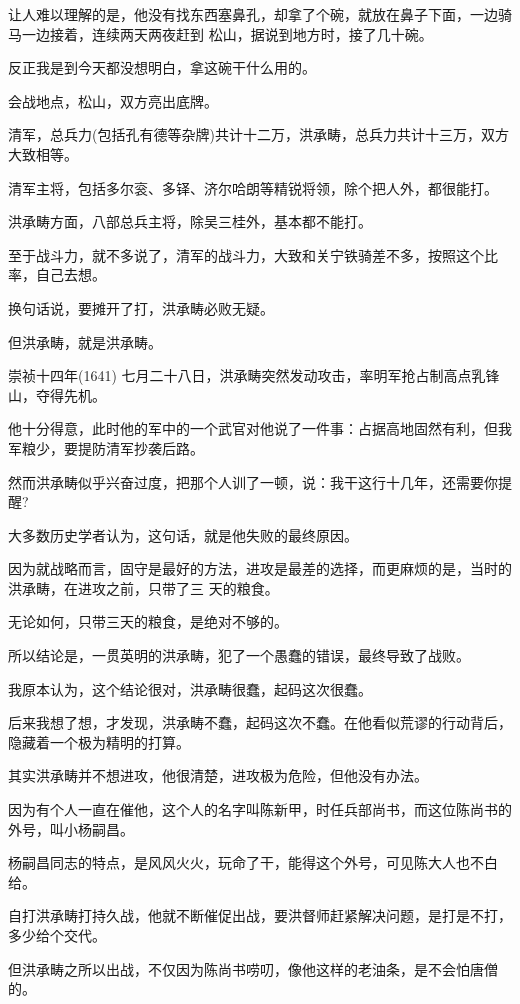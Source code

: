 \documentclass[11pt,a4paper,onecolumn]{article}
\begin{document}
让人难以理解的是，他没有找东西塞鼻孔，却拿了个碗，就放在鼻子下面，一边骑马一边接着，连续两天两夜赶到
松山，据说到地方时，接了几十碗。

反正我是到今天都没想明白，拿这碗干什么用的。

会战地点，松山，双方亮出底牌。

清军，总兵力(包括孔有德等杂牌)共计十二万，洪承畴，总兵力共计十三万，双方大致相等。

清军主将，包括多尔衮、多铎、济尔哈朗等精锐将领，除个把人外，都很能打。

洪承畴方面，八部总兵主将，除吴三桂外，基本都不能打。

至于战斗力，就不多说了，清军的战斗力，大致和关宁铁骑差不多，按照这个比率，自己去想。

换句话说，要摊开了打，洪承畴必败无疑。

但洪承畴，就是洪承畴。

崇祯十四年(1641) 七月二十八日，洪承畴突然发动攻击，率明军抢占制高点乳锋山，夺得先机。

他十分得意，此时他的军中的一个武官对他说了一件事：占据高地固然有利，但我军粮少，要提防清军抄袭后路。

然而洪承畴似乎兴奋过度，把那个人训了一顿，说：我干这行十几年，还需要你提醒?

大多数历史学者认为，这句话，就是他失败的最终原因。

因为就战略而言，固守是最好的方法，进攻是最差的选择，而更麻烦的是，当时的洪承畴，在进攻之前，只带了三
天的粮食。

无论如何，只带三天的粮食，是绝对不够的。

所以结论是，一贯英明的洪承畴，犯了一个愚蠢的错误，最终导致了战败。

我原本认为，这个结论很对，洪承畴很蠢，起码这次很蠢。

后来我想了想，才发现，洪承畴不蠢，起码这次不蠢。在他看似荒谬的行动背后，隐藏着一个极为精明的打算。

其实洪承畴并不想进攻，他很清楚，进攻极为危险，但他没有办法。

因为有个人一直在催他，这个人的名字叫陈新甲，时任兵部尚书，而这位陈尚书的外号，叫小杨嗣昌。

杨嗣昌同志的特点，是风风火火，玩命了干，能得这个外号，可见陈大人也不白给。

自打洪承畴打持久战，他就不断催促出战，要洪督师赶紧解决问题，是打是不打，多少给个交代。

但洪承畴之所以出战，不仅因为陈尚书唠叨，像他这样的老油条，是不会怕唐僧的。

\section[\thesection]{}
\end{document}
